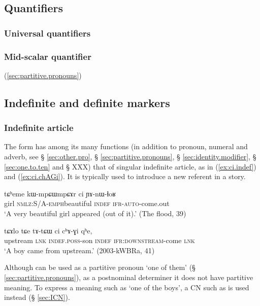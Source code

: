 \subsection{Quantifiers} \label{sec:quantifiers.determiners}
\subsubsection{Universal quantifiers} \label{sec:universal.quant}
\subsubsection{Mid-scalar quantifier} \label{sec:tsuku}
(\ref{sec:partitive.pronouns})

\subsection{Indefinite and definite markers} \label{sec:indefinite.markers}

\subsubsection{Indefinite article} \label{sec:indef.article}
The form  has among its many functions (in addition to pronoun, numeral and adverb, see § \ref{sec:other.pro}, § \ref{sec:partitive.pronouns}, § \ref{sec:identity.modifier}, § \ref{sec:one.to.ten} and § XXX) that of singular indefinite article, as in (\ref{ex:ci.indef}) and (\ref{ex:ci.chAGi}). It is typically used to introduce a new referent in a story.

\begin{exe}
\ex \label{ex:ci.indef}
\gll tɕʰeme kɯ-mpɕɯ\redp{}mpɕɤr ci ɲɤ-nɯ-ɬoʁ \\
girl \textsc{nmlz}:S/A-\textsc{emph}\redp{}beautiful \textsc{indef} \textsc{ifr}-\textsc{auto}-come.out \\
\glt `A very beautiful girl appeared (out of it).' (The flood, 39)
\end{exe}

\begin{exe}
\ex \label{ex:ci.chAGi}
\gll tɕɤlo tɕe tɤ-tɕɯ ci cʰɤ-ɣi qʰe, \\
upstream \textsc{lnk} \textsc{indef}.\textsc{poss}-son \textsc{indef} \textsc{ifr}:\textsc{downstream}-come \textsc{lnk} \\
\glt `A boy came from upstream.' (2003-kWBRa, 41)
\end{exe}

Although  can be used as a partitive pronoun `one of them' (§ \ref{sec:partitive.pronouns}), as a postnominal determiner it does not have partitive meaning. To express a meaning such as `one of the boys', a CN such as  is used instead (§ \ref{sec:ICN}). 

